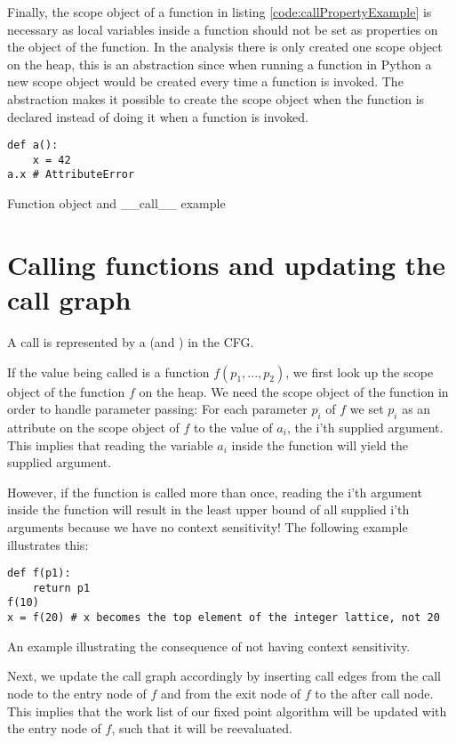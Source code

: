 Finally, the scope object of a function in listing \ref{code:callPropertyExample} is necessary as local variables inside a function should not be set as properties on the object of the function.
In the analysis there is only created one scope object on the heap, this is an abstraction since when running a function in Python a new scope object would be created every time a function is invoked. The abstraction makes it possible to create the scope object when the function is declared instead of doing it when a function is invoked.

\begin{listing}[H]
	\begin{verbatim}
def a(): 
	x = 42
a.x # AttributeError
	\end{verbatim}
\caption{Function object and \_\_call\_\_ example}\label{code:callPropertyExample}
\end{listing}


\section{Calling functions and updating the call graph}
A call is represented by a  (and ) in the CFG.

If the value being called is a function $f(p_1, ..., p_2)$, we first look up the scope object of the function $f$ on the heap. We need the scope object of the function in order to handle parameter passing: For each parameter $p_i$ of $f$ we set $p_i$ as an attribute on the scope object of $f$ to the value of $a_i$, the i'th supplied argument. This implies that reading the variable $a_i$ inside the function will yield the supplied argument.

However, if the function is called more than once, reading the i'th argument inside the function will result in the least upper bound of all supplied i'th arguments because we have no context sensitivity! The following example illustrates this:

\begin{listing}[H]
	\begin{verbatim}
def f(p1): 
	return p1
f(10)
x = f(20) # x becomes the top element of the integer lattice, not 20
	\end{verbatim}
\caption{An example illustrating the consequence of not having context sensitivity.}
\end{listing}

Next, we update the call graph accordingly by inserting call edges from the call node to the entry node of $f$ and from the exit node of $f$ to the after call node. This implies that the work list of our fixed point algorithm will be updated with the entry node of $f$, such that it will be reevaluated.

